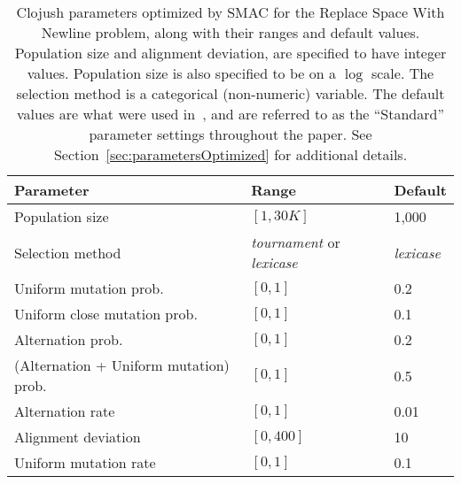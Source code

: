 \begin{table}
	\begin{center}
	\begin{tabular}{p{4cm} p{2cm} l}
		Parameter & Range & Default \\
		\hline
		Population size & $[1, 30K]$ & 1,000 \\
		Selection method & \emph{tournament} \linebreak or \emph{lexicase} & \emph{lexicase} \\
		\hline
		Uniform mutation prob. & $[0, 1]$ & 0.2 \\
		Uniform close mutation prob. & $[0, 1]$ & 0.1 \\
		Alternation prob. & $[0, 1]$ & 0.2 \\
		(Alternation \linebreak + \quad Uniform mutation) prob. & $[0, 1]$ & 0.5 \\
		\hline
		Alternation rate & $[0, 1]$ & 0.01 \\
		Alignment deviation & $[0, 400]$ & 10 \\
		\hline
		Uniform mutation rate & $[0, 1]$ & 0.1
	\end{tabular}
	\end{center}
	\caption{Clojush parameters optimized by SMAC for the Replace Space With 
		Newline problem, along with their ranges and 
		default values.  Population size and
		alignment deviation, are specified to have integer values.  Population
		size is also specified to be on a $\log$ scale. The selection
		method is a categorical (non-numeric) variable. The default
		values are what were used in~\cite{Helmuth:2015:GECCO}, and
		are referred to as the ``Standard'' parameter settings throughout
		the paper.
		See Section~\ref{sec:parametersOptimized} for additional details.
	}
	\label{tab:clojushParameters}
\end{table}

